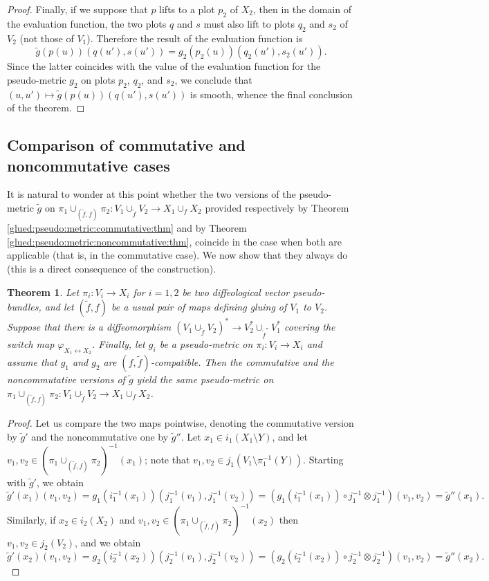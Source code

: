 \documentclass{article}
\newtheorem{thm}[lemma]{Theorem}
\begin{document}
\begin{proof}
Finally, if we suppose that $p$ lifts to a plot $p_2$ of $X_2$, then in the domain of the evaluation function, the two plots $q$ and $s$ must also lift to plots $q_2$ and $s_2$ of $V_2$ (not those of $V_1$). 
Therefore the result of the evaluation function is 
$$\tilde{g}(p(u))(q(u'),s(u'))=g_2(p_2(u))(q_2(u'),s_2(u')).$$ Since the latter coincides with the value of the evaluation function for the pseudo-metric $g_2$ on plots $p_2$, $q_2$, and $s_2$, we conclude 
that $(u,u')\mapsto\tilde{g}(p(u))(q(u'),s(u'))$ is smooth, whence the final conclusion of the theorem.
\end{proof}


\subsection{Comparison of commutative and noncommutative cases}

It is natural to wonder at this point whether the two versions of the pseudo-metric $\tilde{g}$ on $\pi_1\cup_{(\tilde{f},f)}\pi_2:V_1\cup_{\tilde{f}}V_2\to X_1\cup_f X_2$ provided respectively by Theorem
\ref{glued:pseudo:metric:commutative:thm} and by Theorem \ref{glued:pseudo:metric:noncommutative:thm}, coincide in the case when both are applicable (that is, in the commutative case). We now show 
that they always do (this is a direct consequence of the construction).

\begin{thm}\label{two:pseudo:metrics:coincide:when:defined:thm}
Let $\pi_i:V_i\to X_i$ for $i=1,2$ be two diffeological vector pseudo-bundles, and let $(\tilde{f},f)$ be a usual pair of maps defining gluing of $V_1$ to $V_2$. Suppose that there is a diffeomorphism 
$(V_1\cup_{\tilde{f}}V_2)^*\to V_2^*\cup_{\tilde{f}^*}V_1^*$ covering the switch map $\varphi_{X_1\leftrightarrow X_2}$. Finally, let $g_i$ be a pseudo-metric on $\pi_i:V_i\to X_i$ and assume that $g_1$ and 
$g_2$ are $(f,\tilde{f})$-compatible. Then the commutative and the noncommutative versions of $\tilde{g}$ yield the same pseudo-metric on 
$\pi_1\cup_{(\tilde{f},f)}\pi_2:V_1\cup_{\tilde{f}}V_2\to X_1\cup_f X_2$.
\end{thm}

\begin{proof}
Let us compare the two maps pointwise, denoting the commutative version by $\tilde{g}'$ and the noncommutative one by $\tilde{g}''$. Let $x_1\in i_1(X_1\setminus Y)$, and let
$v_1,v_2\in(\pi_1\cup_{(\tilde{f},f)}\pi_2)^{-1}(x_1)$; note that $v_1,v_2\in j_1(V_1\setminus\pi_1^{-1}(Y))$. Starting with $\tilde{g}'$, we obtain
$$\tilde{g}'(x_1)(v_1,v_2)=g_1(i_1^{-1}(x_1))(j_1^{-1}(v_1),j_1^{-1}(v_2))=\left(g_1(i_1^{-1}(x_1))\circ j_1^{-1}\otimes j_1^{-1}\right)(v_1,v_2)=\tilde{g}''(x_1).$$ Similarly, if $x_2\in i_2(X_2)$ and 
$v_1,v_2\in(\pi_1\cup_{(\tilde{f},f)}\pi_2)^{-1}(x_2)$ then $v_1,v_2\in j_2(V_2)$, and we obtain
$$\tilde{g}'(x_2)(v_1,v_2)=g_2(i_2^{-1}(x_2))(j_2^{-1}(v_1),j_2^{-1}(v_2))=\left(g_2(i_2^{-1}(x_2))\circ j_2^{-1}\otimes j_2^{-1}\right)(v_1,v_2)=\tilde{g}''(x_2).$$
\end{proof}
\end{document}

